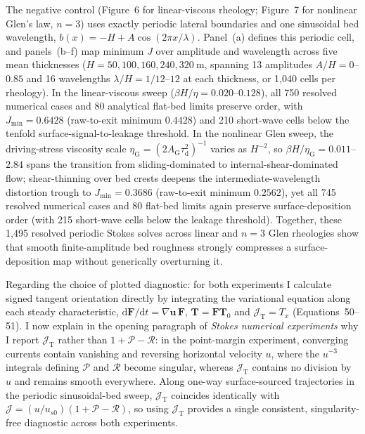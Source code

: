 \documentclass[11pt]{article}
\newcommand{\response}[1]{\noindent\textcolor{responseblue}{#1}}
\begin{document}
\response{The negative control (Figure~6 for linear-viscous rheology; Figure~7 for nonlinear Glen's law, \(n=3\)) uses exactly periodic lateral boundaries and one sinusoidal bed wavelength, \(b(x)=-H+A\cos(2\pi x/\lambda)\). Panel~(a) defines this periodic cell, and panels~(b--f) map minimum \(J\) over amplitude and wavelength across five mean thicknesses (\(H=50, 100, 160, 240, 320~\mathrm{m}\), spanning 13 amplitudes \(A/H=0\)--\(0.85\) and 16 wavelengths \(\lambda/H=1/12\)--\(12\) at each thickness, or 1,040 cells per rheology). In the linear-viscous sweep (\(\beta H/\eta=0.020\)--\(0.128\)), all 750 resolved numerical cases and 80 analytical flat-bed limits preserve order, with \(J_{\min}=0.6428\) (raw-to-exit minimum \(0.4428\)) and 210 short-wave cells below the tenfold surface-signal-to-leakage threshold. In the nonlinear Glen sweep, the driving-stress viscosity scale \(\eta_{\mathrm{G}}=(2A_{\mathrm{G}}\tau_{\mathrm{d}}^2)^{-1}\) varies as \(H^{-2}\), so \(\beta H/\eta_{\mathrm{G}}=0.011\)--\(2.84\) spans the transition from sliding-dominated to internal-shear-dominated flow; shear-thinning over bed crests deepens the intermediate-wavelength distortion trough to \(J_{\min}=0.3686\) (raw-to-exit minimum \(0.2562\)), yet all 745 resolved numerical cases and 80 flat-bed limits again preserve surface-deposition order (with 215 short-wave cells below the leakage threshold). Together, these 1,495 resolved periodic Stokes solves across linear and \(n=3\) Glen rheologies show that smooth finite-amplitude bed roughness strongly compresses a surface-deposition map without generically overturning it.}

\medskip

\response{Regarding the choice of plotted diagnostic: for both experiments I calculate signed tangent orientation directly by integrating the variational equation along each steady characteristic, \(\mathrm{d}\bm{F}/\mathrm{d}t=\nabla\bm{u}\,\bm{F}\), \(\bm{T}=\bm{F}\bm{T}_0\) and \(\mathcal{J}_{\mathrm{T}}=T_x\) (Equations~50--51). I now explain in the opening paragraph of \emph{Stokes numerical experiments} why I report \(\mathcal{J}_{\mathrm{T}}\) rather than \(1+\mathcal{P}-\mathcal{R}\): in the point-margin experiment, converging currents contain vanishing and reversing horizontal velocity \(u\), where the \(u^{-3}\) integrals defining \(\mathcal{P}\) and \(\mathcal{R}\) become singular, whereas \(\mathcal{J}_{\mathrm{T}}\) contains no division by \(u\) and remains smooth everywhere. Along one-way surface-sourced trajectories in the periodic sinusoidal-bed sweep, \(\mathcal{J}_{\mathrm{T}}\) coincides identically with \(\mathcal{J}=(u/u_{s0})(1+\mathcal{P}-\mathcal{R})\), so using \(\mathcal{J}_{\mathrm{T}}\) provides a single consistent, singularity-free diagnostic across both experiments.}
\end{document}
